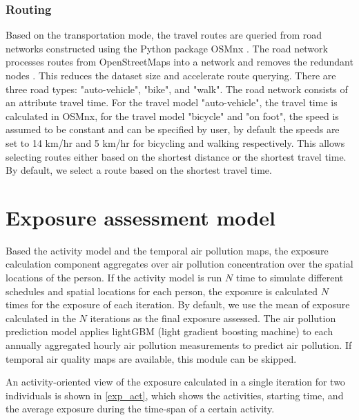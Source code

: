 \documentclass[]{article}
\begin{document}
\subsubsection{Routing} 
Based on the transportation mode, the travel routes are queried from road networks constructed using the Python package OSMnx \citep{boeing2017osmnx}. The road network processes routes from OpenStreetMaps \citep{osmdata} into a network and removes the redundant nodes \citep{boeing2017osmnx}. This reduces the dataset size and accelerate route querying. There are three road types: "auto-vehicle", "bike", and "walk". The road network consists of an attribute travel time. For the travel model "auto-vehicle", the travel time is calculated in OSMnx, for the travel model "bicycle" and "on foot", the speed is assumed to be constant and can be specified by user, by default the speeds are set to 14 km/hr and 5 km/hr for bicycling and walking respectively. This allows selecting routes either based on the shortest distance or the shortest travel time. By default, we select a route based on the shortest travel time.  

\section{Exposure assessment model}
\label{sec:exp}
 
 Based the activity model and the temporal air pollution maps, the exposure calculation component aggregates over air pollution concentration over the spatial locations of the person. If the activity model is run $N$ time to simulate different schedules and spatial locations for each person, the  exposure is calculated $N$ times for the exposure of each iteration. By default, we use the mean of exposure calculated in the $N$ iterations as the final exposure assessed. The air pollution prediction model applies lightGBM (light gradient boosting machine) \citep{ke2017lightgbm} to each annually aggregated hourly air pollution measurements to predict air pollution. If temporal air quality maps are available, this module can be skipped. 
     
An activity-oriented view of the exposure calculated in a single iteration for two individuals is shown in \cref{exp_act}, which shows the activities, starting time, and the average exposure during the time-span of a certain activity.
\end{document}
